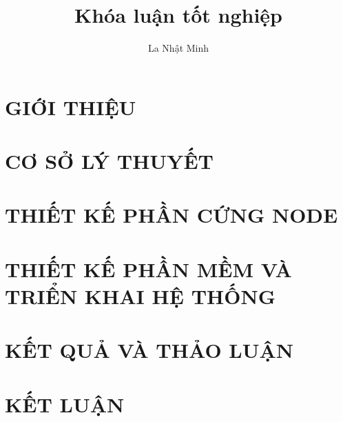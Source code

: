 \documentclass[14pt,a4paper]{report}
\title{Khóa luận tốt nghiệp}
\author{La Nhật Minh}
\begin{document}










\fontsize{13}{15}\selectfont

\chapter{GIỚI THIỆU}








\chapter{CƠ SỞ LÝ THUYẾT}






\chapter{THIẾT KẾ PHẦN CỨNG NODE}






\chapter{THIẾT KẾ PHẦN MỀM VÀ TRIỂN KHAI HỆ THỐNG}





\chapter{KẾT QUẢ VÀ THẢO LUẬN}






\chapter*{KẾT LUẬN}


\end{document}
